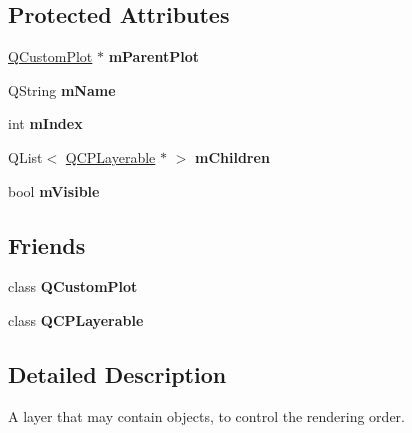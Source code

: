 \subsection*{\-Protected \-Attributes}
\begin{DoxyCompactItemize}
\item 
\hypertarget{classQCPLayer_a2f3374a7884bf403720cd1cf6f7ad1bb}{\hyperlink{classQCustomPlot}{\-Q\-Custom\-Plot} $\ast$ {\bfseries m\-Parent\-Plot}}\label{classQCPLayer_a2f3374a7884bf403720cd1cf6f7ad1bb}

\item 
\hypertarget{classQCPLayer_a91e6298183cb4b9dfd4efdfaf1ecc220}{\-Q\-String {\bfseries m\-Name}}\label{classQCPLayer_a91e6298183cb4b9dfd4efdfaf1ecc220}

\item 
\hypertarget{classQCPLayer_a122088bcab6cec76a52b75ce8606605b}{int {\bfseries m\-Index}}\label{classQCPLayer_a122088bcab6cec76a52b75ce8606605b}

\item 
\hypertarget{classQCPLayer_a704aa71bba469383c3a3c598c1ec0d28}{\-Q\-List$<$ \hyperlink{classQCPLayerable}{\-Q\-C\-P\-Layerable} $\ast$ $>$ {\bfseries m\-Children}}\label{classQCPLayer_a704aa71bba469383c3a3c598c1ec0d28}

\item 
\hypertarget{classQCPLayer_a264950deb08e589460c126c895a1e2b5}{bool {\bfseries m\-Visible}}\label{classQCPLayer_a264950deb08e589460c126c895a1e2b5}

\end{DoxyCompactItemize}
\subsection*{\-Friends}
\begin{DoxyCompactItemize}
\item 
\hypertarget{classQCPLayer_a1cdf9df76adcfae45261690aa0ca2198}{class {\bfseries \-Q\-Custom\-Plot}}\label{classQCPLayer_a1cdf9df76adcfae45261690aa0ca2198}

\item 
\hypertarget{classQCPLayer_ad655f55cccf49ba14d5172ec517e07ae}{class {\bfseries \-Q\-C\-P\-Layerable}}\label{classQCPLayer_ad655f55cccf49ba14d5172ec517e07ae}

\end{DoxyCompactItemize}


\subsection{\-Detailed \-Description}
\-A layer that may contain objects, to control the rendering order. 


